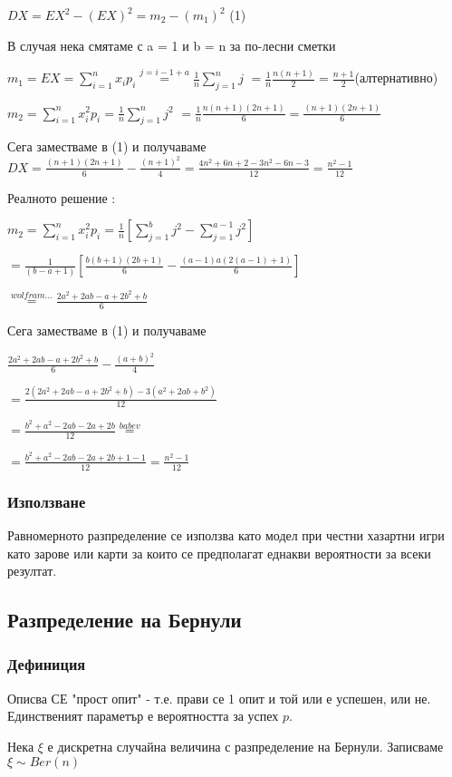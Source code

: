 \documentclass[fleqn,12pt]{article}
\begin{document}
\begin{justify}
$DX = EX^2 - (EX)^2  = m_2 - (m_1)^2$ \indent (1)

В случая нека смятаме с a = 1 и b = n за по-лесни сметки

$m_1 = EX = \sum_{i=1}^n x_ip_i \overset{j = i-1+a}{=} \frac{1}{n} \sum_{j=1}^n j$
$ = \frac{1}{n} \frac{n(n+1)}{2} = \frac{n+1}{2} $(алтернативно)

$m_2 = \sum_{i=1}^n x_i^2 p_i = \frac{1}{n} \sum_{j=1}^n j^2 $ 
$ = \frac{1}{n} \frac{n(n+1)(2n+1)}{6} = \frac{(n+1)(2n+1)}{6}$

Сега заместваме в (1) и получаваме 
$DX = \frac{(n+1)(2n+1)}{6} - \frac{(n+1)^2}{4} = \frac{4n^2+6n+2 - 3n^2-6n-3}{12} = \frac{n^2 - 1}{12}$

Реалното решение : 

$m_2 = \sum_{i=1}^n x_i^2 p_i = \frac{1}{n} [\sum_{j=1}^b j^2  - \sum_{j=1}^{a-1} j^2 ]$ 

$ = \frac{1}{(b-a+1)} [\frac{b(b+1)(2b+1)}{6} - \frac{(a-1)a(2(a-1)+1)}{6}]$

$\overset{wolfram \dots}{=} \frac{2a^2 + 2ab - a + 2b^2 + b}{6}$

Сега заместваме в (1) и получаваме 

$\frac{2a^2 + 2ab - a + 2b^2 + b}{6} - \frac{(a+b)^2}{4}$

$ = \frac{2(2a^2 + 2ab - a + 2b^2 + b) - 3(a^2 + 2ab + b^2)}{12}$

$ = \frac{b^2 + a^2 -2ab -2a + 2b}{12} \overset{babev}{=} $

$ = \frac{b^2 + a^2 -2ab -2a + 2b + 1 - 1}{12} = \frac{n^2 - 1}{12}$ 
\subsubsection{Използване}
Равномерното разпределение се използва като модел при честни хазартни игри като зарове или карти за които се предполагат
еднакви вероятности за всеки резултат.

\subsection{Разпределение на Бернули}
\subsubsection{Дефиниция} 
Описва СЕ "прост опит" - т.е. прави се 1 опит и той или е успешен, или не. Единственият параметър е 
вероятността за успех $p$.

Нека $\xi$ е дискретна случайна величина с разпределение на Бернули. Записваме $\xi \sim Ber(n)$


\end{justify}
\end{document}
